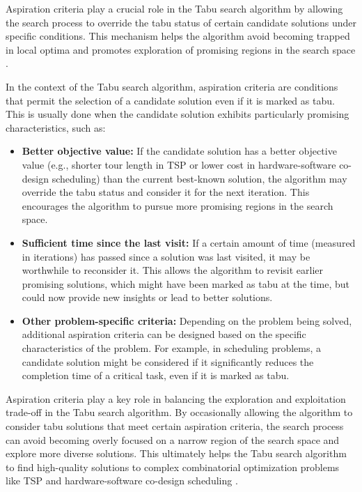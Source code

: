 \documentclass[conference]{IEEEtran}
\begin{document}
Aspiration criteria play a crucial role in the Tabu search algorithm by allowing the search process to override the tabu status of certain candidate solutions under specific conditions. This mechanism helps the algorithm avoid becoming trapped in local optima and promotes exploration of promising regions in the search space \cite{hillier2005introduction}.

In the context of the Tabu search algorithm, aspiration criteria are conditions that permit the selection of a candidate solution even if it is marked as tabu. This is usually done when the candidate solution exhibits particularly promising characteristics, such as:

\begin{itemize}
\item \textbf{Better objective value:} If the candidate solution has a better objective value (e.g., shorter tour length in TSP or lower cost in hardware-software co-design scheduling) than the current best-known solution, the algorithm may override the tabu status and consider it for the next iteration. This encourages the algorithm to pursue more promising regions in the search space.

\item \textbf{Sufficient time since the last visit:} If a certain amount of time (measured in iterations) has passed since a solution was last visited, it may be worthwhile to reconsider it. This allows the algorithm to revisit earlier promising solutions, which might have been marked as tabu at the time, but could now provide new insights or lead to better solutions.

\item \textbf{Other problem-specific criteria:} Depending on the problem being solved, additional aspiration criteria can be designed based on the specific characteristics of the problem. For example, in scheduling problems, a candidate solution might be considered if it significantly reduces the completion time of a critical task, even if it is marked as tabu.

\end{itemize}

Aspiration criteria play a key role in balancing the exploration and exploitation trade-off in the Tabu search algorithm. By occasionally allowing the algorithm to consider tabu solutions that meet certain aspiration criteria, the search process can avoid becoming overly focused on a narrow region of the search space and explore more diverse solutions. This ultimately helps the Tabu search algorithm to find high-quality solutions to complex combinatorial optimization problems like TSP and hardware-software co-design scheduling \cite{ji2004global} \cite{reeves1993modern}.
\end{document}
